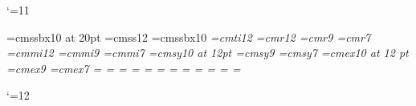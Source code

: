 \catcode`\@=11


\parindent0pt		%
\parskip0pt		%

%
%
\font\titlefont=cmssbx10 at 20pt %
\font\normalfont=cmss12          %
\font\slidetitlefont=cmssbx10    %
\font\it=cmti12
%
\baselineskip=15pt
\font\tfont=cmr12
\font\sfont=cmr9
\font\ssfont=cmr7
\font\tifont=cmmi12
\font\sifont=cmmi9
\font\ssifont=cmmi7
\font\tsyfont=cmsy10 at 12pt
\font\ssyfont=cmsy9
\font\sssyfont=cmsy7
\font\texfont=cmex10 at 12 pt
\font\sexfont=cmex9
\font\ssexfont=cmex7
%
=\tfont
{}=\sfont
{}=\ssfont
{}=\tifont
{}=\sifont
{}=\ssifont
{}=\tsyfont
{}=\ssyfont
{}=\sssyfont
{}=\texfont
{}=\sexfont
{}=\ssexfont
%

\def\NewSlide{\vfill\eject}                      %

\def\SlideTitle#1{%
\global\headline{%
\vbox to 5mm{%
\hbox to \hsize{\slidetitlefont #1}%
\vskip3pt plus 1fil minus 1fil
\hrule height 1pt depth 0pt
}}}

%
%
\def\image[#1]#2{%
\pdfximage #1 {#2}\pdfrefximage\pdflastximage}

\pdfpagewidth=144mm
\pdfpageheight=90mm
\vsize=67mm
\hsize=134mm
\hoffset=-20.4mm
\voffset=-12.4mm

\def\rm{\fam=0} %

\catcode`\@=12
